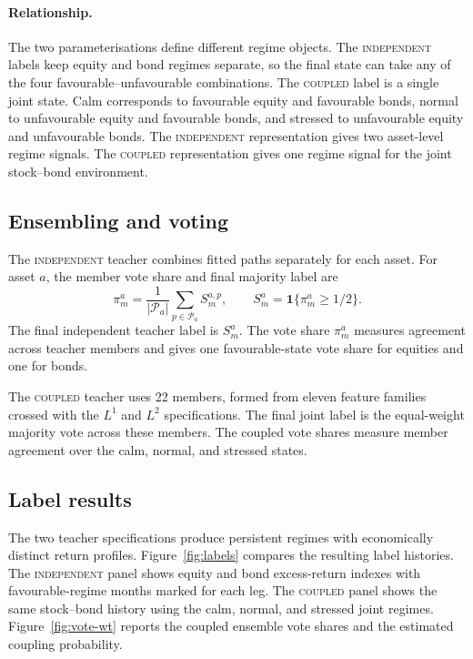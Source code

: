 \documentclass[10pt]{article}
\newcommand{\Path}{\mathcal{P}}
\newcommand{\Acoup}{\textsc{coupled}}
\newcommand{\Bindep}{\textsc{independent}}
\begin{document}
\paragraph{Relationship.}
The two parameterisations define different regime objects. The \Bindep{} labels keep equity and bond regimes separate, so the final state can take any of the four favourable--unfavourable combinations. The \Acoup{} label is a single joint state. Calm corresponds to favourable equity and favourable bonds, normal to unfavourable equity and favourable bonds, and stressed to unfavourable equity and unfavourable bonds. The \Bindep{} representation gives two asset-level regime signals. The \Acoup{} representation gives one regime signal for the joint stock--bond environment.

\subsection{Ensembling and voting}

The \Bindep{} teacher combines fitted paths separately for each asset. For asset \(a\), the member vote share and final majority label are
\begin{equation}
    \pi^a_m
    =
    \frac{1}{|\Path_a|}
    \sum_{p\in\Path_a}S^{a,p}_m,
    \qquad
    S^a_m
    =
    \mathbf{1}\{\pi^a_m\ge 1/2\}.
    \label{eq:independent-vote}
\end{equation}
The final independent teacher label is \(S^a_m\). The vote share \(\pi^a_m\) measures agreement across teacher members and gives one favourable-state vote share for equities and one for bonds.

The \Acoup{} teacher uses 22 members, formed from eleven feature families crossed with the \(L^1\) and \(L^2\) specifications. The final joint label is the equal-weight majority vote across these members. The coupled vote shares measure member agreement over the calm, normal, and stressed states.

\subsection{Label results}
\label{sec:teacher-results}

The two teacher specifications produce persistent regimes with economically distinct return profiles. Figure~\ref{fig:labels} compares the resulting label histories. The \Bindep{} panel shows equity and bond excess-return indexes with favourable-regime months marked for each leg. The \Acoup{} panel shows the same stock--bond history using the calm, normal, and stressed joint regimes. Figure~\ref{fig:vote-wt} reports the coupled ensemble vote shares and the estimated coupling probability.
\end{document}
